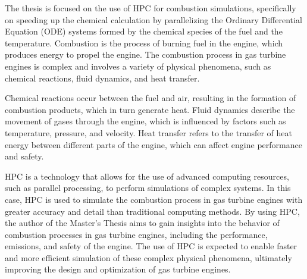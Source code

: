 The thesis is focused on the use of HPC for combustion simulations, specifically on speeding up the chemical calculation by parallelizing the Ordinary Differential Equation (ODE) systems formed by the chemical species of the fuel and the temperature. Combustion is the process of burning fuel in the engine, which produces energy to propel the engine. The combustion process in gas turbine engines is complex and involves a variety of physical phenomena, such as chemical reactions, fluid dynamics, and heat transfer.

Chemical reactions occur between the fuel and air, resulting in the formation of combustion products, which in turn generate heat. Fluid dynamics describe the movement of gases through the engine, which is influenced by factors such as temperature, pressure, and velocity. Heat transfer refers to the transfer of heat energy between different parts of the engine, which can affect engine performance and safety.

HPC is a technology that allows for the use of advanced computing resources, such as parallel processing, to perform simulations of complex systems. In this case, HPC is used to simulate the combustion process in gas turbine engines with greater accuracy and detail than traditional computing methods. By using HPC, the author of the Master's Thesis aims to gain insights into the behavior of combustion processes in gas turbine engines, including the performance, emissions, and safety of the engine. The use of HPC is expected to enable faster and more efficient simulation of these complex physical phenomena, ultimately improving the design and optimization of gas turbine engines.